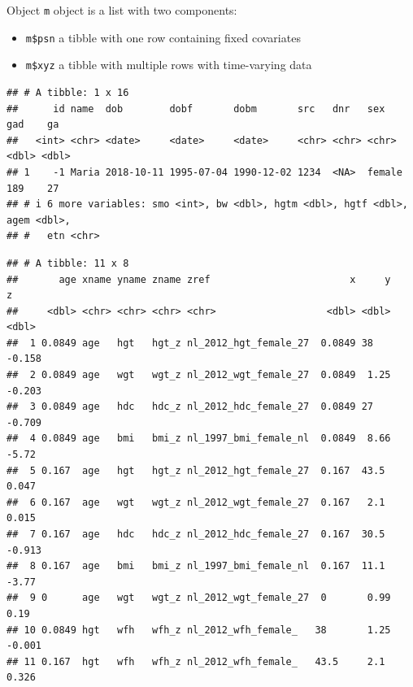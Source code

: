 \documentclass[
]{book}
\newenvironment{Shaded}{\begin{snugshade}}{\end{snugshade}}
\newcommand{\NormalTok}[1]{#1}
\newcommand{\SpecialCharTok}[1]{\textcolor[rgb]{0.00,0.00,0.00}{#1}}
\providecommand{\tightlist}{%
  \setlength{\itemsep}{0pt}\setlength{\parskip}{0pt}}
\begin{document}
Object \texttt{m} object is a list with two components:

\begin{itemize}
\tightlist
\item
  \texttt{m\$psn} a tibble with one row containing fixed covariates
\item
  \texttt{m\$xyz} a tibble with multiple rows with time-varying data
\end{itemize}

\begin{Shaded}
\end{Shaded}

\begin{verbatim}
## # A tibble: 1 x 16
##      id name  dob        dobf       dobm       src   dnr   sex      gad    ga
##   <int> <chr> <date>     <date>     <date>     <chr> <chr> <chr>  <dbl> <dbl>
## 1    -1 Maria 2018-10-11 1995-07-04 1990-12-02 1234  <NA>  female   189    27
## # i 6 more variables: smo <int>, bw <dbl>, hgtm <dbl>, hgtf <dbl>, agem <dbl>,
## #   etn <chr>
\end{verbatim}

\begin{Shaded}
\end{Shaded}

\begin{verbatim}
## # A tibble: 11 x 8
##       age xname yname zname zref                        x     y      z
##     <dbl> <chr> <chr> <chr> <chr>                   <dbl> <dbl>  <dbl>
##  1 0.0849 age   hgt   hgt_z nl_2012_hgt_female_27  0.0849 38    -0.158
##  2 0.0849 age   wgt   wgt_z nl_2012_wgt_female_27  0.0849  1.25 -0.203
##  3 0.0849 age   hdc   hdc_z nl_2012_hdc_female_27  0.0849 27    -0.709
##  4 0.0849 age   bmi   bmi_z nl_1997_bmi_female_nl  0.0849  8.66 -5.72 
##  5 0.167  age   hgt   hgt_z nl_2012_hgt_female_27  0.167  43.5   0.047
##  6 0.167  age   wgt   wgt_z nl_2012_wgt_female_27  0.167   2.1   0.015
##  7 0.167  age   hdc   hdc_z nl_2012_hdc_female_27  0.167  30.5  -0.913
##  8 0.167  age   bmi   bmi_z nl_1997_bmi_female_nl  0.167  11.1  -3.77 
##  9 0      age   wgt   wgt_z nl_2012_wgt_female_27  0       0.99  0.19 
## 10 0.0849 hgt   wfh   wfh_z nl_2012_wfh_female_   38       1.25 -0.001
## 11 0.167  hgt   wfh   wfh_z nl_2012_wfh_female_   43.5     2.1   0.326
\end{verbatim}
\end{document}
